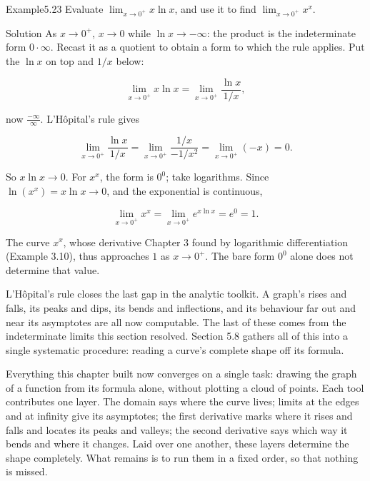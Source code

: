 \documentclass[a4paper,12pt,oneside]{memoir}
\begin{document}
\begin{workedexample}
\begin{envexample}{Example}{5.23}{}
Evaluate \(\displaystyle \lim_{x \to 0^{+}} x \ln x\), and use it to find \(\displaystyle \lim_{x \to 0^{+}} x^{x}\).
\end{envexample}
\begin{envsolution}{Solution}{}{}
As \(x \to 0^{+}\), \(x \to 0\) while \(\ln x \to -\infty\): the product is the indeterminate form \(0 \cdot \infty\). Recast it as a quotient to obtain a form to which the rule applies. Put the \(\ln x\) on top and \(1/x\) below:

\[ \lim_{x \to 0^{+}} x \ln x = \lim_{x \to 0^{+}} \frac{\ln x}{1/x}, \]

now \(\tfrac{-\infty}{\infty}\). L’Hôpital’s rule gives

\[ \lim_{x \to 0^{+}} \frac{\ln x}{1/x} = \lim_{x \to 0^{+}} \frac{1/x}{-1/x^{2}} = \lim_{x \to 0^{+}} (-x) = 0. \]

So \(x \ln x \to 0\). For \(x^{x}\), the form is \(0^{0}\); take logarithms. Since \(\ln(x^{x}) = x \ln x \to 0\), and the exponential is continuous,

\[ \lim_{x \to 0^{+}} x^{x} = \lim_{x \to 0^{+}} e^{x \ln x} = e^{0} = 1. \]

The curve \(x^{x}\), whose derivative Chapter 3 found by logarithmic differentiation (Example 3.10), thus approaches \(1\) as \(x \to 0^{+}\). The bare form \(0^{0}\) alone does not determine that value. \qedmark
\end{envsolution}
\end{workedexample}
L’Hôpital’s rule closes the last gap in the analytic toolkit. A graph’s rises and falls, its peaks and dips, its bends and inflections, and its behaviour far out and near its asymptotes are all now computable. The last of these comes from the indeterminate limits this section resolved. Section 5.8 gathers all of this into a single systematic procedure: reading a curve’s complete shape off its formula.


Everything this chapter built now converges on a single task: drawing the graph of a function from its formula alone, without plotting a cloud of points. Each tool contributes one layer. The domain says where the curve lives; limits at the edges and at infinity give its asymptotes; the first derivative marks where it rises and falls and locates its peaks and valleys; the second derivative says which way it bends and where it changes. Laid over one another, these layers determine the shape completely. What remains is to run them in a fixed order, so that nothing is missed.
\end{document}
